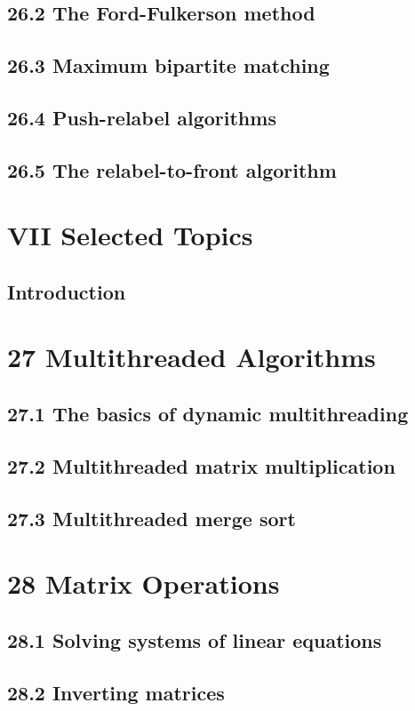 \documentclass[a4paper]{article}
\begin{document}
\subsection{26.2 The Ford-Fulkerson method}
\subsection{26.3 Maximum bipartite matching}
\subsection{26.4 Push-relabel algorithms}
\subsection{26.5 The relabel-to-front algorithm}

\newpage
\section{VII Selected Topics}
\subsection{Introduction}

\newpage
\section{27 Multithreaded Algorithms}
\subsection{27.1 The basics of dynamic multithreading}
\subsection{27.2 Multithreaded matrix multiplication}
\subsection{27.3 Multithreaded merge sort}

\section{28 Matrix Operations}
\subsection{28.1 Solving systems of linear equations}
\subsection{28.2 Inverting matrices}
\end{document}
